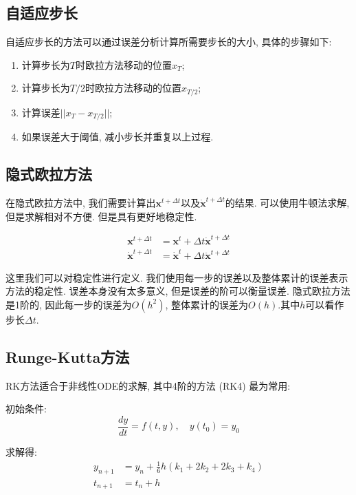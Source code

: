 \subsection{自适应步长}

自适应步长的方法可以通过误差分析计算所需要步长的大小, 具体的步骤如下: 

\begin{enumerate}
	\item 计算步长为$T$时欧拉方法移动的位置$x_T$; 
	\item 计算步长为$T/2$时欧拉方法移动的位置$x_{T/2}$; 
	\item 计算误差$||x_T-x_{T/2}||$; 
	\item 如果误差大于阈值, 减小步长并重复以上过程. 
\end{enumerate}

\subsection{隐式欧拉方法}

在隐式欧拉方法中, 我们需要计算出$\mathbf{x}^{t+\Delta t}$以及$\dot{\mathbf{x}}^{t+\Delta t} $的结果. 可以使用牛顿法求解, 但是求解相对不方便. 但是具有更好地稳定性. 

\begin{equation}
	\begin{split}
		\mathbf{x}^{t+\Delta t} &=\mathbf{x}^{t}+\Delta t \dot{\mathbf{x}}^{t+\Delta t} \\
		\dot{\mathbf{x}}^{t+\Delta t} &=\dot{\mathbf{x}}^{t}+\Delta t \ddot{\mathbf{x}}^{t+\Delta t}
	\end{split}
\end{equation}

这里我们可以对稳定性进行定义. 我们使用每一步的误差以及整体累计的误差表示方法的稳定性. 误差本身没有太多意义, 但是误差的阶可以衡量误差. 隐式欧拉方法是1阶的, 因此每一步的误差为$O(h^2)$, 整体累计的误差为$O(h)$.其中$h$可以看作步长$\Delta t$.

\subsection{Runge-Kutta方法}

RK方法适合于非线性ODE的求解, 其中4阶的方法 (RK4) 最为常用: 

初始条件: 
\begin{equation}
	\frac{d y}{d t}=f(t, y), \quad y\left(t_{0}\right)=y_{0}
\end{equation}

求解得: 
\begin{equation}
	\begin{split}
		y_{n+1}&=y_{n}+\frac{1}{6} h\left(k_{1}+2 k_{2}+2 k_{3}+k_{4}\right) \\
		t_{n+1}&=t_{n}+h
	\end{split}
\end{equation}

